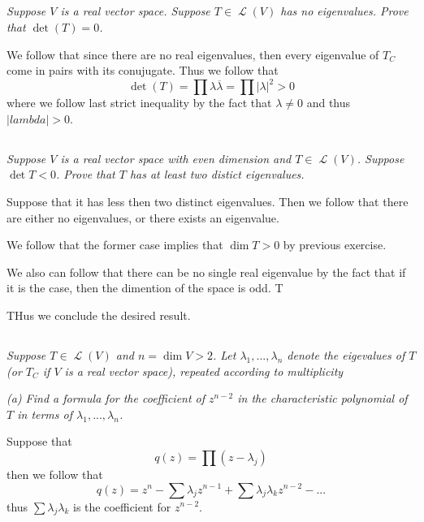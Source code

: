 \documentclass[11pt,oneside,titlepage]{book}
\DeclareMathOperator \map {\mathcal {L}}
\begin{document}
\subsection{}

\textit{Suppose $V$ is a real vector space. Suppose $T \in \map(V)$ has no eigenvalues.
  Prove that $\det(T) = 0$.}

We follow that since there are no real eigenvalues, then every eigenvalue of $T_C$ come
in pairs with its conujugate. Thus we follow that
$$\det(T) = \prod{\lambda \overline{\lambda}} = \prod{|\lambda|^2} > 0$$
where we follow last strict inequality by the fact that $\lambda \neq 0$ and thus
$|lambda| > 0$.

\subsection{}

\textit{Suppose $V$ is a real vector space with even dimension and $T \in \map(V)$.
  Suppose $\det T < 0$. Prove that $T$ has at least two distict eigenvalues.}

Suppose that it has less then two distinct eigenvalues. Then we follow that there are
either no eigenvalues, or there exists an eigenvalue.

We follow that the former case implies that $\dim T > 0$ by previous exercise.

We also can follow that there can be no single real eigenvalue by the fact that if it is
the case, then the dimention of the space is odd. T

THus we conclude the desired result.

\subsection{}

\textit{Suppose $T \in \map(V)$ and $n = \dim V > 2$. Let $\lambda_1, ..., \lambda_n$ denote the
  eigevalues of $T$ (or $T_C$ if $V$ is a real vector space), repeated according to
  multiplicity }

\textit{(a) Find a formula for the coefficient of $z^{n - 2}$ in the characteristic polynomial
  of $T$ in terms of $\lambda_1, ..., \lambda_n$.}

Suppose that
$$q(z) = \prod{(z - \lambda_j)}$$
then we follow that
$$q(z) = z^n - \sum{\lambda_j}z^{n - 1} + \sum{\lambda_j \lambda_k}z^{n - 2} - ... $$
thus $\sum{\lambda_j \lambda_k}$ is the coefficient for $z^{n - 2}$.
\end{document}
